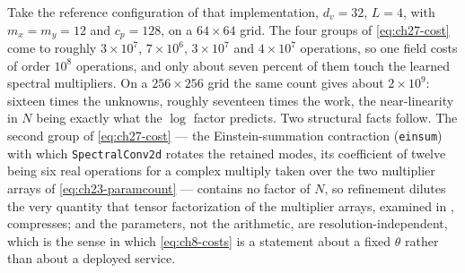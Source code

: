 Take the reference configuration of that implementation, $d_v = 32$, $L = 4$,
with $m_x = m_y = 12$ and $c_p = 128$, on a $64\times64$ grid. The four groups of \eqref{eq:ch27-cost}
come to roughly $3\times10^{7}$, $7\times10^{6}$, $3\times10^{7}$ and
$4\times10^{7}$ operations, so one field costs of order $10^{8}$ operations, and
only about seven percent of them touch the learned spectral multipliers. On a
$256\times256$ grid the same count gives about $2\times10^{9}$: sixteen times the
unknowns, roughly seventeen times the work, the near-linearity in $N$ being exactly
what the $\log$ factor predicts. Two structural facts follow. The second group of
\eqref{eq:ch27-cost} --- the Einstein-summation contraction (\texttt{einsum}) with
which \texttt{SpectralConv2d} rotates the retained modes, its coefficient of twelve
being six real operations for a complex multiply taken over the two multiplier
arrays of \eqref{eq:ch23-paramcount} --- contains no factor of
$N$, so refinement dilutes the very quantity that tensor factorization of the
multiplier arrays, examined in
, compresses; and the parameters, not the
arithmetic, are resolution-independent, which is the sense in which
\eqref{eq:ch8-costs} is a statement about a fixed $\theta$ rather than about a
deployed service.


